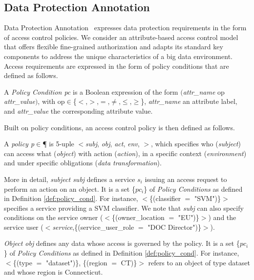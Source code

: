       \subsection{Data Protection Annotation}\label{sec:nonfuncannotation}
      Data Protection Annotation \myLambda\ expresses data protection requirements in the form of access control policies. We consider an attribute-based access control model that offers flexible fine-grained authorization and adapts its standard key components to address the unique characteristics of a big data environment. Access requirements are expressed in the form of policy conditions that are defined as follows.

      \begin{definition}\label{def:policy_cond}
        A \emph{Policy Condition pc} is a Boolean expression of the form $($\emph{attr\_name} op \emph{attr\_value}$)$, with op$\in$\{$<$,$>$,$=$,$\neq$,$\leq$,$\geq$\}, \emph{attr\_name} an attribute label, and \emph{attr\_value} the corresponding attribute value.
      \end{definition}

      Built on policy conditions, an access control policy is then defined as follows.
      
      \begin{definition}[Policy]\label{def:policy_rule}
        A {\it policy p}$\in$\P{} is 5-uple $<$\textit{subj}, \textit{obj}, \textit{act}, \textit{env}, \textit{\TP}$>$, which specifies who (\emph{subject}) can access what (\emph{object}) with action (\emph{action}), in a specific context (\emph{environment}) and under specific obligations (\emph{data transformation}).
      \end{definition}
   
      More in detail, \textit{subject subj} defines a service $s_i$ issuing an access request to perform an action on an object. It is a set \{$pc_i$\} of \emph{Policy Conditions} as defined in Definition \ref{def:policy_cond}. For instance, $<$\{(classifier $=$ "SVM")\}$>$ specifies a service providing a SVM classifier. We note that \textit{subj} can also specify conditions on the service owner ($<$\{(owner\_location $=$ "EU")\}$>$) and the service user ($<$\emph{service},\{(service\_user\_role $=$ "DOC Director")\}$>$).

      \textit{Object obj} defines any data whose access is governed by the policy. It is a set \{$pc_i$\} of \emph{Policy Conditions} as defined in Definition \ref{def:policy_cond}. 
      For instance, $<$\{(type $=$ "dataset")\}, \{(region $=$ CT)\}$>$ refers to an object of type dataset and whose region is Connecticut.

